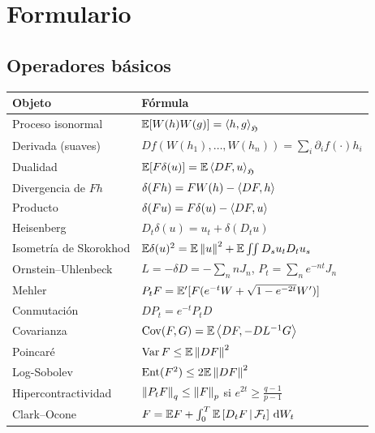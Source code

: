 \chapter{Formulario}\label{ap:formulario}

\section*{Operadores básicos}
\begin{center}
\renewcommand{\arraystretch}{1.25}
\begin{tabular}{p{4.2cm}p{9.5cm}}
\toprule
Objeto & Fórmula\\
\midrule
Proceso isonormal & $\mathbb{E}[W(h)W(g)]=\left\langle h, g\right\rangle_{\mathfrak{H}}$\\
Derivada (suaves) & $Df(W(h_1),\dots,W(h_n))=\sum_i\partial_if(\cdot)h_i$\\
Dualidad & $\mathbb{E}[F\delta(u)]=\mathbb{E}\left\langle DF, u\right\rangle_{\mathfrak{H}}$\\
Divergencia de $Fh$ & $\delta(Fh)=FW(h)-\left\langle DF, h\right\rangle$\\
Producto & $\delta(Fu)=F\delta(u)-\left\langle DF, u\right\rangle$\\
Heisenberg & $D_t\delta(u)=u_t+\delta(D_tu)$\\
Isometría de Skorokhod & $\mathbb{E}\delta(u)^2=\mathbb{E}\left\lVert u\right\rVert^2+\mathbb{E}\iint D_su_tD_tu_s$\\
Ornstein--Uhlenbeck & $L=-\delta D=-\sum_nnJ_n$, $P_t=\sum_ne^{-nt}J_n$\\
Mehler & $P_tF=\mathbb{E}'[F(e^{-t}W+\sqrt{1-e^{-2t}}W')]$\\
Conmutación & $DP_t=e^{-t}P_tD$\\
Covarianza & $\operatorname{Cov}(F,G)=\mathbb{E}\left\langle DF, -DL^{-1}G\right\rangle$\\
Poincaré & $\operatorname{Var} F\le\mathbb{E}\left\lVert DF\right\rVert^2$\\
Log-Sobolev & $\operatorname{Ent}(F^2)\le2\mathbb{E}\left\lVert DF\right\rVert^2$\\
Hipercontractividad & $\left\lVert P_tF\right\rVert_q\le\left\lVert F\right\rVert_p$ si $e^{2t}\ge\frac{q-1}{p-1}$\\
Clark--Ocone & $F=\mathbb{E} F+\int_0^T\mathbb{E}\left[D_tF\,\middle|\,\mathcal{F}_t\right]\,\mathrm{d} W_t$\\
\bottomrule
\end{tabular}
\end{center}

